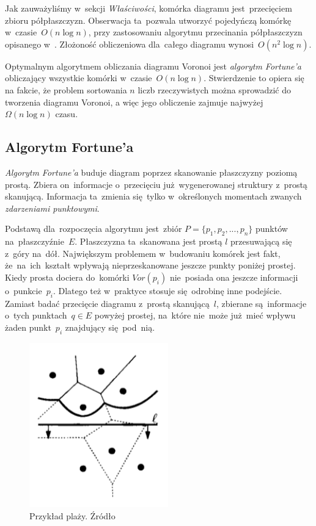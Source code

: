 \documentclass[skorowidz,autorrok,backref,xodstep,oswiadczenie]{wmimgr}
\begin{document}
Jak zauważyliśmy w~sekcji \emph{Właściwości}, komórka diagramu jest~przecięciem zbioru półpłaszczyzn. Obserwacja ta~pozwala utworzyć pojedyńczą komórkę w~czasie~$O(n \log{n})$, przy zastosowaniu algorytmu przecinania półpłaszczyzn opisanego w~\cite{geometria}. Złożoność obliczeniowa dla~całego diagramu wynosi~$O(n^2 \log{n})$.

Optymalnym algorytmem obliczania diagramu Voronoi jest \emph{algorytm Fortune'a} obliczający wszystkie komórki w~czasie~$O(n \log{n})$. Stwierdzenie to opiera się na fakcie, że problem sortowania $n$ liczb rzeczywistych można sprowadzić do tworzenia diagramu Voronoi, a więc jego obliczenie zajmuje najwyżej $\Omega(n \log{n})$ czasu.

\subsection{Algorytm Fortune'a}

\emph{Algorytm Fortune'a} buduje diagram poprzez skanowanie płaszczyzny poziomą prostą. Zbiera on~informacje o~przecięciu już~wygenerowanej struktury z~prostą skanującą. Informacja ta~zmienia się~tylko w~określonych momentach zwanych \emph{zdarzeniami punktowymi}.

Podstawą dla~rozpoczęcia algorytmu jest~zbiór $P = \{p_{1},p_{2},...,p_{n}\}$ punktów na~płaszczyźnie~$E$. Płaszczyzna ta~skanowana jest prostą $l$ przesuwającą się z~góry na~dół. Największym problemem w~budowaniu komórek jest fakt, że~na~ich~kształt wpływają nieprzeskanowane jeszcze punkty poniżej prostej. Kiedy prosta dociera do~komórki $Vor(p_{i})$ nie~posiada ona jeszcze informacji o~punkcie~$p_{i}$. Dlatego też w~praktyce stosuje się~odrobinę inne podejście. Zamiast badać przecięcie diagramu z~prostą skanującą~$l$, zbierane są~informacje o~tych punktach~$q \in E$ powyżej prostej, na~które nie~może już~mieć wpływu żaden punkt~$p_{i}$ znajdujący się~pod~nią.

\begin{figure}[ht!]
\centering
\includegraphics[width=60mm]{images/voronoi3.png}
\caption{Przykład plaży. Źródło \cite{geometria}}
\label{voronoibeach}
\end{figure}
\end{document}
